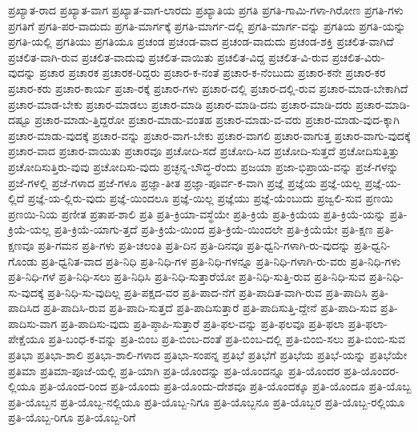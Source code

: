 {ಪ್ರಖ್ಯಾತ-ರಾದ
ಪ್ರಖ್ಯಾತ-ವಾಗ
ಪ್ರಖ್ಯಾತ-ವಾಗ-ಲಾರದು
ಪ್ರಖ್ಯಾತಿಯ
ಪ್ರಗತಿ
ಪ್ರಗತಿ-ಗಾಮಿ-ಗಳಾ-ಗಿರೋಣ
ಪ್ರಗತಿ-ಗಳು
ಪ್ರಗತಿಗೆ
ಪ್ರಗತಿ-ಪರ-ವಾದುದು
ಪ್ರಗತಿ-ಮಾರ್ಗಕ್ಕೆ
ಪ್ರಗತಿ-ಮಾರ್ಗ-ದಲ್ಲಿ
ಪ್ರಗತಿ-ಮಾರ್ಗ-ವನ್ನು
ಪ್ರಗತಿಯ
ಪ್ರಗತಿ-ಯನ್ನು
ಪ್ರಗತಿ-ಯಲ್ಲಿ
ಪ್ರಗತಿಯು
ಪ್ರಗತಿಯೂ
ಪ್ರಚಂಡ
ಪ್ರಚಂಡ-ವಾದ
ಪ್ರಚಂಡ-ವಾದುದು
ಪ್ರಚಂಡ-ಶಕ್ತಿ
ಪ್ರಚಲಿತ-ವಾಗಿದೆ
ಪ್ರಚಲಿತ-ವಾಗಿ-ರುವ
ಪ್ರಚಲಿತ-ವಾದುವು
ಪ್ರಚಲಿತ-ವಾಯಿತು
ಪ್ರಚಲಿತ-ವಿದ್ದ
ಪ್ರಚಲಿತ-ವಿ-ರುವ
ಪ್ರಚಲಿತ-ವಿರು-ವುದನ್ನು
ಪ್ರಚಾರ
ಪ್ರಚಾರಕ
ಪ್ರಚಾರಕ-ರಿದ್ದರು
ಪ್ರಚಾರ-ಕ-ನಂತೆ
ಪ್ರಚಾರ-ಕ-ನೆಂಬುದು
ಪ್ರಚಾರ-ಕನೇ
ಪ್ರಚಾರ-ಕರ
ಪ್ರಚಾರ-ಕರು
ಪ್ರಚಾರ-ಕಾರ್ಯ
ಪ್ರಚಾ-ರಕ್ಕೆ
ಪ್ರಚಾರ-ಗಳು
ಪ್ರಚಾರ-ದಲ್ಲಿ
ಪ್ರಚಾರ-ದಲ್ಲಿ-ರುವ
ಪ್ರಚಾರ-ಮಾಡ-ಬೇಕಾಗಿದೆ
ಪ್ರಚಾರ-ಮಾಡ-ಬೇಕು
ಪ್ರಚಾರ-ಮಾಡಲು
ಪ್ರಚಾರ-ಮಾಡಿ
ಪ್ರಚಾರ-ಮಾಡಿ-ದನು
ಪ್ರಚಾರ-ಮಾಡಿ-ದರು
ಪ್ರಚಾರ-ಮಾಡಿ-ದಷ್ಟೂ
ಪ್ರಚಾರ-ಮಾಡು-ತ್ತಿದ್ದರೋ
ಪ್ರಚಾರ-ಮಾಡು-ವಂತಹ
ಪ್ರಚಾರ-ಮಾಡು-ವ-ವರು
ಪ್ರಚಾರ-ಮಾಡು-ವುದ-ಕ್ಕಾಗಿ
ಪ್ರಚಾರ-ಮಾಡು-ವುದಕ್ಕೆ
ಪ್ರಚಾರ-ವನ್ನು
ಪ್ರಚಾರ-ವಾಗ-ಬೇಕು
ಪ್ರಚಾರ-ವಾಗಲಿ
ಪ್ರಚಾರ-ವಾಗುತ್ತ
ಪ್ರಚಾರ-ವಾಗು-ವುದಕ್ಕೆ
ಪ್ರಚಾರ-ವಾದ
ಪ್ರಚಾರ-ವಾಯಿತು
ಪ್ರಚಾರವೂ
ಪ್ರಚೋದಿ-ಸದೆ
ಪ್ರಚೋದಿ-ಸಿದ
ಪ್ರಚೋದಿ-ಸುತ್ತದೆ
ಪ್ರಚೋದಿಸುತ್ತಿತ್ತು
ಪ್ರಚೋದಿಸುತ್ತಿರು-ವುವು
ಪ್ರಚೋದಿಸು-ವುದು
ಪ್ರಚ್ಛನ್ನ-ಬೌದ್ಧ-ರೆಂದು
ಪ್ರಜಯಾ
ಪ್ರಜಾ-ಭಿಪ್ರಾಯ-ವನ್ನು
ಪ್ರಜೆ-ಗಳನ್ನು
ಪ್ರಜೆ-ಗಳಲ್ಲಿ
ಪ್ರಜೆ-ಗಳಾದ
ಪ್ರಜೆ-ಗಳೂ
ಪ್ರಜ್ಞಾ-ತೀತ
ಪ್ರಜ್ಞಾ-ಪೂರ್ವ-ಕ-ವಾಗಿ
ಪ್ರಜ್ಞೆ
ಪ್ರಜ್ಞೆಯ
ಪ್ರಜ್ಞೆ-ಯಲ್ಲ
ಪ್ರಜ್ಞೆ-ಯ-ಲ್ಲಿದೆ
ಪ್ರಜ್ಞೆ-ಯ-ಲ್ಲಿರು-ವುದು
ಪ್ರಜ್ಞೆ-ಯಿಂದಲೂ
ಪ್ರಜ್ಞೆ-ಯಿಲ್ಲ
ಪ್ರಜ್ಞೆಯು
ಪ್ರಜ್ಞೆ-ಯೆಂಬುದು
ಪ್ರಜ್ವಲಿ-ಸುವ
ಪ್ರಣಯಿ
ಪ್ರಣಯಿ-ನಿಯ
ಪ್ರಣೀತ
ಪ್ರತಾಪ-ಶಾಲಿ
ಪ್ರತಿ
ಪ್ರತಿ-ಕ್ರಿಯಾ-ವಸ್ಥೆಯೇ
ಪ್ರತಿ-ಕ್ರಿಯೆ
ಪ್ರತಿ-ಕ್ರಿಯೆಯ
ಪ್ರತಿ-ಕ್ರಿಯೆ-ಯನ್ನು
ಪ್ರತಿ-ಕ್ರಿಯೆ-ಯಲ್ಲ
ಪ್ರತಿ-ಕ್ರಿಯೆ-ಯಾಗು-ತ್ತದೆ
ಪ್ರತಿ-ಕ್ರಿಯೆ-ಯಿಂದ
ಪ್ರತಿ-ಕ್ರಿಯೆ-ಯಿಂದಲೇ
ಪ್ರತಿ-ಕ್ರಿಯೆಯೇ
ಪ್ರತಿ-ಕ್ಷಣ
ಪ್ರತಿ-ಕ್ಷಣವೂ
ಪ್ರತಿ-ಗಮನ
ಪ್ರತಿ-ಗಳು
ಪ್ರತಿ-ಚಲಂತಿ
ಪ್ರತಿ-ದಿನ
ಪ್ರತಿ-ದಿನವೂ
ಪ್ರತಿ-ಧ್ವನಿ-ಗಳಾಗಿ-ರು-ವುದನ್ನು
ಪ್ರತಿ-ಧ್ವನಿ-ಗೊಂಡು
ಪ್ರತಿ-ಧ್ವನಿತ-ವಾದ
ಪ್ರತಿ-ನಿಧಿ
ಪ್ರತಿ-ನಿಧಿ-ಗಳ
ಪ್ರತಿ-ನಿಧಿ-ಗಳನ್ನೂ
ಪ್ರತಿ-ನಿಧಿ-ಗಳಾಗಿ-ರು-ವರು
ಪ್ರತಿ-ನಿಧಿ-ಗಳು
ಪ್ರತಿ-ನಿಧಿ-ಗಳೆ
ಪ್ರತಿ-ನಿಧಿ-ಸಲು
ಪ್ರತಿ-ನಿಧಿಸಿ
ಪ್ರತಿ-ನಿಧಿ-ಸುತ್ತಾರೆಯೋ
ಪ್ರತಿ-ನಿಧಿ-ಸುತ್ತಿ-ರುವ
ಪ್ರತಿ-ನಿಧಿ-ಸುವ
ಪ್ರತಿ-ನಿಧಿ-ಸು-ವುದಕ್ಕೆ
ಪ್ರತಿ-ನಿಧಿ-ಸು-ವುದಿಲ್ಲ
ಪ್ರತಿ-ಪಕ್ಷದ-ವರ
ಪ್ರತಿ-ಪಾದ-ನೆಗೆ
ಪ್ರತಿ-ಪಾದಿತ-ವಾಗಿ-ರುವ
ಪ್ರತಿ-ಪಾದಿಸಿ
ಪ್ರತಿ-ಪಾದಿಸಿದ
ಪ್ರತಿ-ಪಾದಿಸಿ-ರುವ
ಪ್ರತಿ-ಪಾದಿ-ಸುತ್ತದೆ
ಪ್ರತಿ-ಪಾದಿಸುತ್ತಾರೆ
ಪ್ರತಿ-ಪಾದಿಸುತ್ತಿ-ದ್ದೇನೆ
ಪ್ರತಿ-ಪಾದಿ-ಸುವ
ಪ್ರತಿ-ಪಾದಿಸು-ವಾಗ
ಪ್ರತಿ-ಪಾದಿಸು-ವುದು
ಪ್ರತಿ-ಪ್ಠಾಪಿ-ಸುತ್ತಾರೆ
ಪ್ರತಿ-ಫಲ-ವನ್ನು
ಪ್ರತಿ-ಫಲವೂ
ಪ್ರತಿ-ಫಲಾ
ಪ್ರತಿ-ಫಲಾ-ಪೇಕ್ಷೆಯೂ
ಪ್ರತಿ-ಬಂಧ-ಕ-ವನ್ನು
ಪ್ರತಿ-ಬಿಂಬ
ಪ್ರತಿ-ಬಿಂಬ-ದಂತೆ
ಪ್ರತಿ-ಬಿಂಬ-ದಲ್ಲಿ
ಪ್ರತಿ-ಬಿಂಬಿ-ಸಲು
ಪ್ರತಿ-ಬಿಂಬಿ-ಸುವ
ಪ್ರತಿಭಾ
ಪ್ರತಿಭಾ-ಶಾಲಿ
ಪ್ರತಿಭಾ-ಶಾಲಿ-ಗಳಾದ
ಪ್ರತಿಭಾ-ಸಂಪನ್ನ
ಪ್ರತಿಭೆ
ಪ್ರತಿಭೆಗೆ
ಪ್ರತಿಭೆಯ
ಪ್ರತಿಭೆ-ಯನ್ನು
ಪ್ರತಿಭೆಯೇ
ಪ್ರತಿಮಾ
ಪ್ರತಿಮಾ-ಪೂಜೆ-ಯಲ್ಲಿ
ಪ್ರತಿ-ಯಾಗಿ
ಪ್ರತಿ-ಯೊಂದನ್ನು
ಪ್ರತಿ-ಯೊಂದನ್ನೂ
ಪ್ರತಿ-ಯೊಂದರ
ಪ್ರತಿ-ಯೊಂದರ-ಲ್ಲಿಯೂ
ಪ್ರತಿ-ಯೊಂದ-ರಿಂದ
ಪ್ರತಿ-ಯೊಂದು
ಪ್ರತಿ-ಯೊಂದು-ದೇಶವೂ
ಪ್ರತಿ-ಯೊಂದಕ್ಕೂ
ಪ್ರತಿ-ಯೊಂದೂ
ಪ್ರತಿ-ಯೊಬ್ಬ
ಪ್ರತಿ-ಯೊಬ್ಬನ
ಪ್ರತಿ-ಯೊಬ್ಬ-ನಲ್ಲಿಯೂ
ಪ್ರತಿ-ಯೊಬ್ಬ-ನಿಗೂ
ಪ್ರತಿ-ಯೊಬ್ಬನೂ
ಪ್ರತಿ-ಯೊಬ್ಬರ
ಪ್ರತಿ-ಯೊಬ್ಬ-ರಲ್ಲಿಯೂ
ಪ್ರತಿ-ಯೊಬ್ಬ-ರಿಗೂ
ಪ್ರತಿ-ಯೊಬ್ಬ-ರಿಗೆ
}

